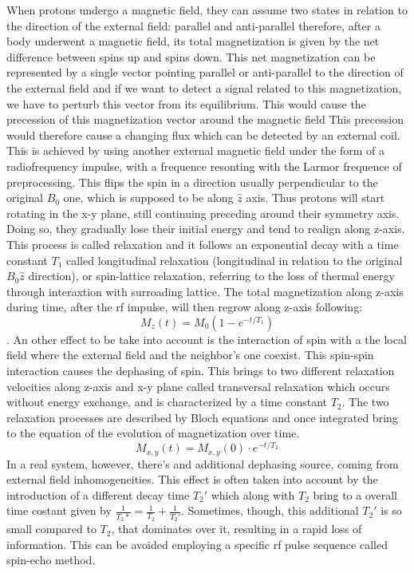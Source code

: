 \documentclass[10pt]{report}
\begin{document}
When protons undergo a magnetic field, they can assume two states in relation to the direction of the external field: parallel and anti-parallel
therefore, after a body underwent a magnetic field, its total magnetization is given by the net difference between spins up and spins down.
This net magnetization can be represented by a single vector pointing parallel or anti-parallel to the direction of the external field and if we want to detect a signal related to this magnetization, we have to perturb this vector from its equilibrium.
This would cause the precession of this magnetization vector around the magnetic field
This precession would therefore cause a changing flux which can be detected by an external coil.
This is achieved by using another external magnetic field under the form of a radiofrequency impulse, with a frequence resonting with the Larmor frequence of preprocessing. This flips the spin in a direction usually perpendicular to the original $B_0$ one, which is supposed to be along $\hat z$ axis. Thus protons will start rotating in the x-y plane, still continuing preceding around their symmetry axis.
Doing so, they gradually lose their initial energy and tend to realign along z-axis.
This process is called relaxation and it follows an exponential decay with a time constant $T_1$ called longitudinal relaxation (longitudinal in relation to the original $B_0 \hat z$ direction), or spin-lattice relaxation, referring to the loss of thermal energy through interaxtion with surroading lattice. The total magnetization along z-axis during time, after the rf impulse, will then regrow along z-axis following:
\begin{equation}
M_z(t) = M_0 (1-e^{-t/T_1})
\end{equation}.
An other effect to be take into account is the interaction of spin with a the local field where the external field and the neighbor's one coexist. This spin-spin interaction causes the dephasing of spin. This brings to two different relaxation velocities along z-axis and x-y plane called transversal relaxation which occurs without energy exchange, and is characterized by a time constant $T_2$. The two relaxation processes are described by Bloch equations and once integrated bring to the equation of the evolution of magnetization over time.
\begin{equation}
M_{x, y}(t) = M_{x,y}(0)\cdot e^{-t/T_2}
\end{equation}
In a real system, however, there's and additional dephasing source, coming from external field inhomogeneities.
This effect is often taken into account by the introduction of a different decay time $T_2'$ which along with $T_2$ bring to a overall time costant given by $\frac{1}{T_2*} = \frac{1}{T_2}+\frac{1}{T_2'}$.
Sometimes, though, this additional $T_2'$ is so small compared to $T_2$, that dominates over it, resulting in a rapid loss of information.
This can be avoided employing a specific rf pulse sequence called spin-echo method.
\end{document}

